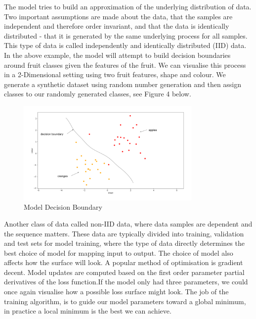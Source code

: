 The model tries to build an approximation of the underlying distribution of data. Two important assumptions are made about the data, that the samples are independent and therefore order invariant, and that the data is identically distributed - that it is generated by the same underlying process for all samples. This type of data is called independently and identically distributed (IID) data. In the above example, the model will attempt to build decision boundaries around fruit classes given the features of the fruit. We can visualise this process in a 2-Dimensional setting using two fruit features, shape and colour. We generate a synthetic dataset using random number generation and then assign classes to our randomly generated classes, see Figure 4 below.

\begin{figure}[H]
  	\caption{Model Decision Boundary}
   	\centering
    	\includegraphics[width=0.8\textwidth]{oranges_and_apples_decision_boundary}
\end{figure}

Another class of data called non-IID data, where data samples are dependent and the sequence matters. These data are typically divided into training, validation and test sets for model training, where the type of data directly determines the best choice of model for mapping input to output. The choice of model also affects how the surface will look. A popular method of optimisation is gradient decent. Model updates are computed based on the first order parameter partial derivatives of the loss function.If the model only had three parameters, we could once again visualise how a possible loss surface might look. The job of the training algorithm, is to guide our model parameters toward a global minimum, in practice a local minimum is the best we can achieve.



